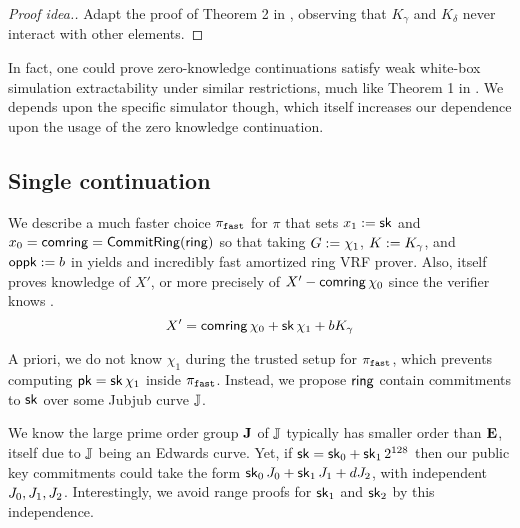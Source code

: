 \begin{proof}[Proof idea.]
Adapt the proof of Theorem 2 in \cite[\S3, pp. 9]{RandomizationGroth16},
observing that $K_\gamma$ and $K_\delta$ never interact with other elements. 
\end{proof}


In fact, one could prove zero-knowledge continuations satisfy
weak white-box simulation extractability under similar restrictions,
much like Theorem 1 in \cite[\S3, pp. 8 \& 11]{RandomizationGroth16}.
We depends upon the specific simulator though, which itself increases
our dependence upon the usage of the zero knowledge continuation.


\subsection{Single continuation}
\label{subsec:rvrf_faster}


We describe a much faster choice $\pi_{\mathtt{fast}}$ for $\pi$
that sets $x_1 := \mathsf{sk}$ and $x_0 = \mathsf{comring} = {\mathsf{CommitRing}}(\mathsf{ring})$ so that
taking $G := \chi_1$, $K := K_\gamma$, and $\mathsf{oppk} := b$ in \PedVRF
yields and incredibly fast amortized ring VRF prover.
Also, \PedVRF itself proves knowledge of $X'$,
 or more precisely of $X' - \mathsf{comring}\, \chi_0$ since the verifier knows \comring.
$$ X' = \mathsf{comring}\, \chi_0 + \mathsf{sk}\, \chi_1 + b K_\gamma $$


A priori, we do not know $\chi_1$ during the trusted setup for $\pi_{\mathtt{fast}}$,
which prevents computing $\mathsf{pk} = \mathsf{sk}\, \chi_1$ inside $\pi_{\mathtt{fast}}$.
Instead, we propose $\mathsf{ring}$ contain commitments to $\mathsf{sk}$ over
some Jubjub curve ${\mathbb{J}}$.  

We know the large prime order group ${\mathbf{J}}$ of ${\mathbb{J}}$ typically has
smaller order than ${\mathbf{E}}$, itself due to ${\mathbb{J}}$ being an Edwards curve. 
Yet, if $\mathsf{sk} = \mathsf{sk}_0 + \mathsf{sk}_1 \, 2^{128}$ then our public key commitments could
take the form $\mathsf{sk}_0\, J_0 + \mathsf{sk}_1\, J_1 + d J_2$,
with independent $J_0,J_1,J_2$.
Interestingly, we avoid range proofs for $\mathsf{sk}_1$ and $\mathsf{sk}_2$
by this independence. 

